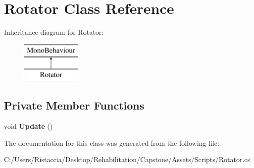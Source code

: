 \hypertarget{class_rotator}{}\section{Rotator Class Reference}
\label{class_rotator}
Inheritance diagram for Rotator\+:\begin{figure}[H]
\begin{center}
\leavevmode
\includegraphics[height=2.000000cm]{class_rotator}
\end{center}
\end{figure}
\subsection*{Private Member Functions}
\begin{DoxyCompactItemize}
\item 
\mbox{\label{class_rotator_a5b573a6122b39499ebd67d6db7c905e9}} 
void {\bfseries Update} ()
\end{DoxyCompactItemize}


The documentation for this class was generated from the following file\+:\begin{DoxyCompactItemize}
\item 
C\+:/\+Users/\+Ristaccia/\+Desktop/\+Rehabilitation/\+Capstone/\+Assets/\+Scripts/Rotator.\+cs\end{DoxyCompactItemize}
